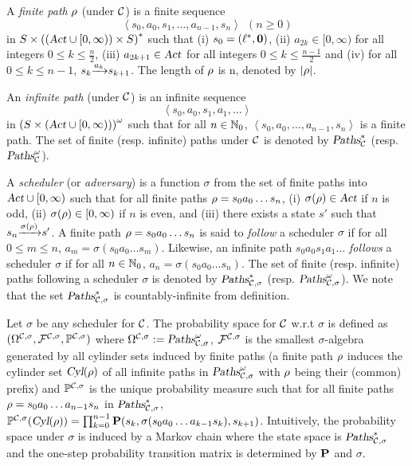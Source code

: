 \smallskip {}
A \emph{finite path} $\rho$ (under $\mathcal{C}$) is a finite sequence
\[
\left\langle s_0,a_0,s_1,\dots,a_{n-1},s_n\right\rangle~~(n\ge 0)
\]
in $S\times{\left((\mbox{\sl Act}\cup[0,\infty))\times S\right)}^*$
such that (i) $s_0=(\ell^*,\mathbf{0})$,
(ii) $a_{2k}\in [0,\infty)$ for all integers $0\le k\le \frac{n}{2}$,
(iii) $a_{2k+1}\in \mbox{\sl Act}$ for all integers $0\le k\le \frac{n-1}{2}$ and 
(iv) for all $0\le k\le n-1$, ${s_k}{\xrightarrow{a_k}}{s_{k+1}}$.
The length of $\rho$ is n, denoted by $\left| \rho \right|$.

An \emph{infinite path} (under $\mathcal{C}$) is an infinite sequence
\[
\left\langle s_0,a_0,s_1,a_1,\dots\right\rangle
\]
in ${\left(S\times(\mbox{\sl Act}\cup[0,\infty))\right)}^\omega$
such that for all $n\in\mathbb{N}_0$, $\left\langle s_0,a_0,\dots,a_{n-1},s_n\right\rangle$ is a finite path.
The set of finite (resp. infinite) paths  under $\mathcal{C}$ is denoted by $\mbox{\sl Paths}^*_{\mathcal{C}}$ (resp. $\mbox{\sl Paths}^\omega_{\mathcal{C}}$).



\smallskip {}
A \emph{scheduler} (or \emph{adversary}) is a function $\sigma$ from the set of finite paths into $\mbox{\sl Act}\cup [0,\infty)$ such that for all finite paths $\rho=s_0a_0\dots s_n$,
(i) $\sigma(\rho)\in\mbox{\sl Act}$ if $n$ is odd, (ii) $\sigma(\rho)\in  [0,\infty)$ if $n$ is even, and (iii)
there exists a state $s'$ such that ${s_n}{\xrightarrow{\sigma(\rho)}}{s'}$.
A finite path $\rho=s_0a_0\dots s_n$ is said to \emph{follow} a scheduler $\sigma$ if for all $0\le m\le n$, $a_m=\sigma\left(s_0a_0\dots s_m\right)$.
Likewise, an infinite path $s_0a_0s_1a_1\dots$ \emph{follows} a scheduler $\sigma$ if for all $n\in\mathbb{N}_0$, $a_n=\sigma\left(s_0a_0\dots s_n\right)$.
The set of finite (resp. infinite) paths following a scheduler $\sigma$ is denoted by $\mbox{\sl Paths}^*_{\mathcal{C},\sigma}$ (resp. $\mbox{\sl Paths}^\omega_{\mathcal{C},\sigma}$).
We note that the set $\mbox{\sl Paths}^*_{\mathcal{C},\sigma}$ is countably-infinite from definition.

\smallskip {}
Let $\sigma$ be any scheduler for $\mathcal{C}$.
The probability space for $\mathcal{C}$ w.r.t $\sigma$ is defined as $(\Omega^{\mathcal{C},\sigma}, \mathcal{F}^{\mathcal{C},\sigma}, \mathbb{P}^{\mathcal{C},\sigma})$ where $\Omega^{\mathcal{C},\sigma}:=\mbox{\sl Paths}^\omega_{\mathcal{C},\sigma}$, $\mathcal{F}^{\mathcal{C},\sigma}$ is the smallest $\sigma$-algebra generated by all cylinder sets induced by finite paths (a finite path $\rho$ induces the cylinder set $\mbox{\sl Cyl}(\rho)$ of all infinite paths in $\mbox{\sl Paths}^\omega_{\mathcal{C},\sigma}$ with $\rho$ being their (common) prefix)
and $\mathbb{P}^{\mathcal{C},\sigma}$ is the unique probability measure such that for all finite paths $\rho=s_0a_0\dots a_{n-1}s_n$ in $\mbox{\sl Paths}^*_{\mathcal{C},\sigma}$,
$\mathbb{P}^{\mathcal{C},\sigma}(\mbox{\sl Cyl}(\rho))=\prod_{k=0}^{n-1} \mathbf{P}(s_k, \sigma(s_0a_0\dots a_{k-1}s_k), s_{k+1})$.
Intuitively, the probability space under $\sigma$ is induced by a Markov chain where the state space is $\mbox{\sl Paths}^*_{\mathcal{C},\sigma}$ and the one-step probability transition matrix is determined by $\mathbf{P}$ and $\sigma$.

